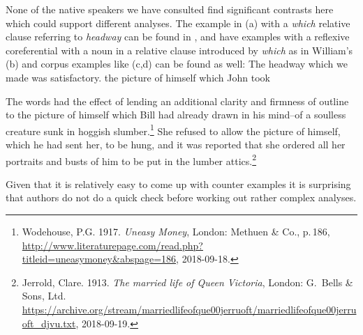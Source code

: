 \documentclass[output=paper]{langsci/langscibook}
\begin{document}
\zl
\eal
{}
\label{ex:min-picture-that}
\label{ex:min-picture-which} 
\zl
None of the native speakers we have consulted find significant contrasts here which could support
different analyses. The example in (a) with a \emph{which} relative clause referring to \emph{headway} can be found in
,  and  have examples
with a reflexive coreferential with a noun in a relative clause introduced by \emph{which} as in
William's (b) and corpus examples like (c,d) can be found as well:
\ealnoraggedright
\ex The headway which we made was satisfactory.
\ex the picture of himself which John took

\ex The words had the effect of lending an additional clarity and firmness of outline to the picture
    of himself which Bill had already drawn in his mind--of a soulless creature sunk in hoggish
    slumber.\footnote{
      Wodehouse, P.G. 1917. \emph{Uneasy Money}, London: Methuen \& Co., p.\,186,
      \url{http://www.literaturepage.com/read.php?titleid=uneasymoney&abspage=186},
      2018-09-18.
}
\ex She refused to allow the 
picture of himself, which he had sent her, to be hung, 
and it was reported that she ordered all her portraits 
and busts of him to be put in the lumber attics.\footnote{
 Jerrold, Clare. 1913. \emph{The married life of Queen Victoria}, London: G.\ Bells \& Sons, Ltd.
 \url{https://archive.org/stream/marriedlifeofque00jerruoft/marriedlifeofque00jerruoft_djvu.txt}, 2018-09-19.
}

\zl
%
Given that it is relatively easy to come up with counter examples it is surprising that authors do
not do a quick check before working out rather complex analyses.
\end{document}
